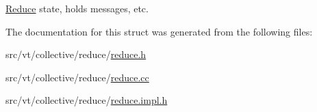 \hyperlink{structvt_1_1collective_1_1reduce_1_1_reduce}{Reduce} state, holds messages, etc. 

The documentation for this struct was generated from the following files\+:\begin{DoxyCompactItemize}
\item 
src/vt/collective/reduce/\hyperlink{reduce_8h}{reduce.\+h}\item 
src/vt/collective/reduce/\hyperlink{reduce_8cc}{reduce.\+cc}\item 
src/vt/collective/reduce/\hyperlink{reduce_8impl_8h}{reduce.\+impl.\+h}\end{DoxyCompactItemize}

